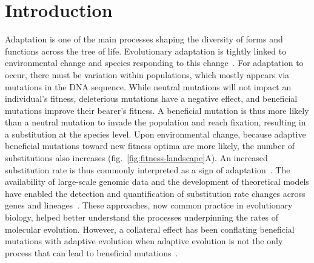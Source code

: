 \documentclass[12pt]{article}
\begin{document}
\section*{Introduction}
Adaptation is one of the main processes shaping the diversity of forms and functions across the tree of life.
Evolutionary adaptation is tightly linked to environmental change and species responding to this change~\cite{merrell_adaptive_1994, gavrilets_adaptive_2009}.
For adaptation to occur, there must be variation within populations, which mostly appears via mutations in the DNA sequence.
While neutral mutations will not impact an individual's fitness, deleterious mutations have a negative effect, and beneficial mutations improve their bearer's fitness.
A beneficial mutation is thus more likely than a neutral mutation to invade the population and reach fixation, resulting in a substitution at the species level.
Upon environmental change, because adaptive beneficial mutations toward new fitness optima are more likely, the number of substitutions also increases (fig.~\ref{fig:fitness-landscape}A).
An increased substitution rate is thus commonly interpreted as a sign of adaptation~\cite{mcdonald_adaptative_1991, smith_adaptive_2002, welch_estimating_2006}.
The availability of large-scale genomic data and the development of theoretical models have enabled the detection and quantification of substitution rate changes across genes and lineages~\cite{yang_statistical_2000, eyre-walker_genomic_2006, moutinho_variation_2019}.
These approaches, now common practice in evolutionary biology, helped better understand the processes underpinning the rates of molecular evolution.
However, a collateral effect has been conflating beneficial mutations with adaptive evolution when adaptive evolution is not the only process that can lead to beneficial mutations~\cite{charlesworth_other_2007, mustonen_fitness_2009}.
\end{document}
